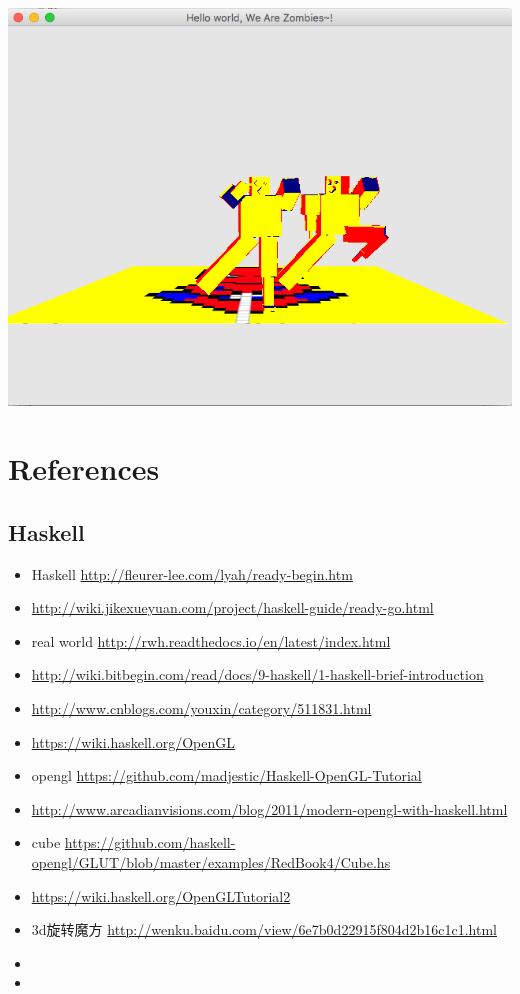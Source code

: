\documentclass[9pt,b5paper]{article}
\begin{document}
\includegraphics[width=.9\linewidth]{./pic/Screen_Shot_2016-05-31_at_1_52_26_AM.png}

\section{References}
\label{sec-2}
\subsection{Haskell}
\label{sec-2-1}
\begin{itemize}
\item Haskell \url{http://fleurer-lee.com/lyah/ready-begin.htm}
\item \url{http://wiki.jikexueyuan.com/project/haskell-guide/ready-go.html}
\item real world \url{http://rwh.readthedocs.io/en/latest/index.html}
\item \url{http://wiki.bitbegin.com/read/docs/9-haskell/1-haskell-brief-introduction}
\item \url{http://www.cnblogs.com/youxin/category/511831.html}
\item \url{https://wiki.haskell.org/OpenGL}
\item opengl \url{https://github.com/madjestic/Haskell-OpenGL-Tutorial}
\item \url{http://www.arcadianvisions.com/blog/2011/modern-opengl-with-haskell.html}
\item cube \url{https://github.com/haskell-opengl/GLUT/blob/master/examples/RedBook4/Cube.hs}
\item \url{https://wiki.haskell.org/OpenGLTutorial2}
\item 3d旋转魔方 \url{http://wenku.baidu.com/view/6e7b0d22915f804d2b16c1c1.html}
\item 
\item 
\end{itemize}
\end{document}
